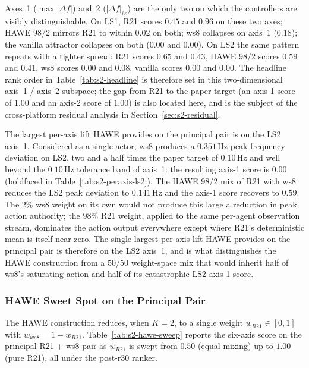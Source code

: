 \documentclass{unnc-fyp}
\begin{document}
Axes~1 ($\max|\Delta f|$) and~2 ($|\Delta f|_{6\mathrm{s}}$) are
the only two on which the controllers are visibly distinguishable.
On LS1, R21 scores $0.45$ and $0.96$ on these two axes; HAWE 98/2
mirrors R21 to within $0.02$ on both; ws8 collapses on axis~1
($0.18$); the vanilla attractor collapses on both ($0.00$ and
$0.00$).
On LS2 the same pattern repeats with a tighter spread: R21 scores
$0.65$ and $0.43$, HAWE 98/2 scores $0.59$ and $0.41$, ws8 scores
$0.00$ and $0.08$, vanilla scores $0.00$ and $0.00$.
The headline rank order in Table~\ref{tab:s2-headline} is
therefore set in this two-dimensional axis~1 / axis~2 subspace; the
gap from R21 to the paper target (an axis-1 score of $1.00$ and an
axis-2 score of $1.00$) is also located here, and is the subject
of the cross-platform residual analysis in
Section~\ref{sec:s2-residual}.

The largest per-axis lift HAWE provides on the principal pair is on the LS2 axis~1.
Considered as a single actor, ws8 produces a $0.351$\,Hz peak
frequency deviation on LS2, two and a half times the paper target
of $0.10$\,Hz and well beyond the $0.10$\,Hz tolerance band of
axis~1: the resulting axis-1 score is $0.00$ (boldfaced in
Table~\ref{tab:s2-peraxis-ls2}).
The HAWE 98/2 mix of R21 with ws8 reduces the LS2 peak deviation
to $0.141$\,Hz and the axis-1 score recovers to $0.59$.
The $2\%$ ws8 weight on its own would not produce this large a
reduction in peak action authority; the $98\%$ R21 weight, applied
to the same per-agent observation stream, dominates the action
output everywhere except where R21's deterministic mean is itself
near zero.
The single largest per-axis lift HAWE provides on the principal
pair is therefore on the LS2 axis~1, and is what distinguishes the
HAWE construction from a $50/50$ weight-space mix that would
inherit half of ws8's saturating action and half of its
catastrophic LS2 axis-1 score.

\subsubsection{HAWE Sweet Spot on the Principal Pair}
\label{sec:s2-hawe-sweetspot}

The HAWE construction reduces, when $K = 2$, to a single weight
$w_{R21} \in [0, 1]$ with $w_{ws8} = 1 - w_{R21}$.
Table~\ref{tab:s2-hawe-sweep} reports the six-axis score on the
principal R21 + ws8 pair as $w_{R21}$ is swept from $0.50$ (equal
mixing) up to $1.00$ (pure R21), all under the post-r30 ranker.
\end{document}
